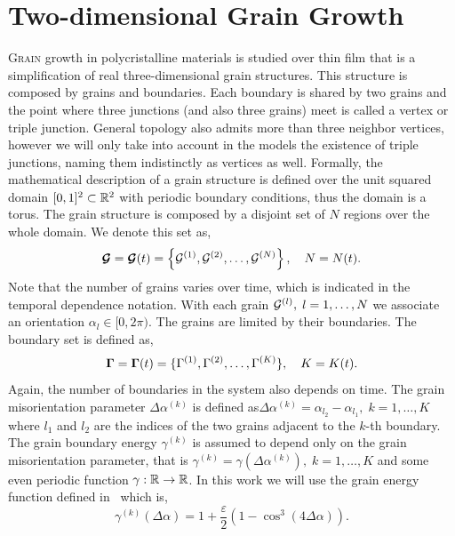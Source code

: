 \chapter{Two-dimensional Grain Growth}
\label{chap:2dgrains}

\lettrine{G}{rain} growth in polycristalline materials is studied over thin film that is a simplification of real three-dimensional grain structures. 
This structure is composed by grains and boundaries. 
Each boundary is shared by two grains and the point where three junctions (and also three grains) meet is called a vertex or triple junction. 
General topology also admits more than three neighbor vertices, however we will only take into account in the models the existence of triple junctions, naming them indistinctly as vertices as well.
Formally, the mathematical description of a grain structure is defined over the unit squared domain $[0,1]^2 \subset \mathbb{R}^2$ with periodic boundary conditions, thus the domain is a torus. 
The grain structure is composed by a disjoint set of $N$ regions over the whole domain. 
We denote this set as,
\begin{equation}
    \bm{\mathcal{G}} = \bm{\mathcal{G}}(t) = \left \{ \mathcal{G}^{(1)}, \mathcal{G}^{(2)}, \dotsc, \mathcal{G}^{(N)} \right \},\quad N=N(t).
    \label{eq:grainsdef}
\end{equation}
Note that the number of grains varies over time, which is indicated in the temporal dependence notation. 
With each grain $\mathcal{G}^{(l)},\; l = 1,\dotsc, N$ we associate an orientation $\alpha_l \in [0, 2\pi)$. 
The grains are limited by their boundaries. 
The boundary set is defined as,
\begin{equation}
    \bm{\Gamma} = \bm{\Gamma}(t) = \{\Gamma^{(1)}, \Gamma^{(2)}, \dotsc, \Gamma^{(K)}\},\quad K=K(t).
    \label{eq:boundariesdef}
\end{equation}
Again, the number of boundaries in the system also depends on time. 
The grain misorientation parameter $\Delta \alpha^{(k)}$ is defined as$\Delta \alpha^{(k)} = \alpha_{l_2} - \alpha_{l_1},\;k = 1,\dotsc,K$ where $l_1$ and $l_2$ are the indices of the two grains adjacent to the $k$-th boundary. The grain boundary energy $\gamma^{(k)}$ is assumed to depend only on the grain misorientation parameter, 
that is $\gamma^{(k)} = \gamma(\Delta \alpha^{(k)}),\; k = 1,\dotsc,K$ and some even periodic function $\gamma: \mathbb{R} \rightarrow \mathbb{R}$. 
In this work we will use the grain energy function defined in~\cite{Kinderlehrer2006} which is,
\begin{equation}
    \gamma^{(k)}(\Delta \alpha) = 1 + \frac{\varepsilon}{2}\left(1-\cos^3(4\Delta\alpha)\right)
    \label{eq:gamma}.
\end{equation}
